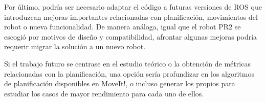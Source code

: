 \documentclass[12pt,spanish,chapterprefix, numbers=noenddot]{book}
\numberwithin{equation}{section}
\numberwithin{figure}{section}
\begin{document}
Por último, podría ser necesario adaptar el código a futuras versiones de ROS que introduzcan mejoras importantes relacionadas con planificación, movimientos del robot o nueva funcionalidad. De manera análoga, igual que el robot PR2 se escogió por motivos de diseño y compatibilidad, afrontar algunas mejoras podría requerir migrar la solución a un nuevo robot. 

Si el trabajo futuro se centrase en el estudio teórico o la obtención de métricas relacionadas con la planificación, una opción sería profundizar en los algoritmos de planificación disponibles en MoveIt!, o incluso generar los propios para estudiar los casos de mayor rendimiento para cada uno de ellos. 

\printbibliography[heading=bibintoc]
\printindex
\end{document}
